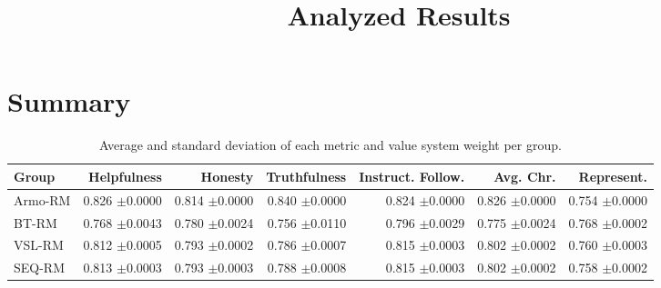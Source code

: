 \documentclass{article}
\begin{document}
\title{Analyzed Results}

\date{}

\maketitle

\section*{Summary}

\begin{table}[p]
\centering
\small
\caption{Average and standard deviation of each metric and value system weight per group.}
\label{tab:group-summary}
\begin{tabular}{lrrrrrr}
\toprule
Group & Helpfulness & Honesty & Truthfulness & Instruct. Follow. & Avg. Chr. & Represent. \\
\midrule
Armo-RM & \makecell[r]{0.826 \\ $\pm$0.0000} & \makecell[r]{0.814 \\ $\pm$0.0000} & \makecell[r]{0.840 \\ $\pm$0.0000} & \makecell[r]{0.824 \\ $\pm$0.0000} & \makecell[r]{0.826 \\ $\pm$0.0000} & \makecell[r]{0.754 \\ $\pm$0.0000} \\
BT-RM & \makecell[r]{0.768 \\ $\pm$0.0043} & \makecell[r]{0.780 \\ $\pm$0.0024} & \makecell[r]{0.756 \\ $\pm$0.0110} & \makecell[r]{0.796 \\ $\pm$0.0029} & \makecell[r]{0.775 \\ $\pm$0.0024} & \makecell[r]{0.768 \\ $\pm$0.0002} \\
VSL-RM & \makecell[r]{0.812 \\ $\pm$0.0005} & \makecell[r]{0.793 \\ $\pm$0.0002} & \makecell[r]{0.786 \\ $\pm$0.0007} & \makecell[r]{0.815 \\ $\pm$0.0003} & \makecell[r]{0.802 \\ $\pm$0.0002} & \makecell[r]{0.760 \\ $\pm$0.0003} \\
SEQ-RM & \makecell[r]{0.813 \\ $\pm$0.0003} & \makecell[r]{0.793 \\ $\pm$0.0003} & \makecell[r]{0.788 \\ $\pm$0.0008} & \makecell[r]{0.815 \\ $\pm$0.0003} & \makecell[r]{0.802 \\ $\pm$0.0002} & \makecell[r]{0.758 \\ $\pm$0.0002} \\
\bottomrule
\end{tabular}
\end{table}
\end{document}
